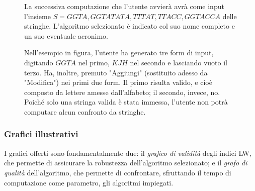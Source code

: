 \begin{figure}[ht!]
    \centering
    \caption{La successiva computazione che l'utente avvierà avrà come input l'insieme $S={GGTA, GGTATATA, TTTAT, TTACC, GGTACCA}$ delle stringhe. L'algoritmo selezionato è indicato col suo nome completo e un suo eventuale acronimo.}
    \label{fig:esempio}
\end{figure}

\begin{figure}[ht!]
    \centering
    \caption{Nell'esempio in figura, l'utente ha generato tre form di input, digitando $GGTA$ nel primo, $KJH$ nel secondo e lasciando vuoto il terzo. Ha, inoltre, premuto "Aggiungi" (sostituito adesso da "Modifica") nei primi due form. Il primo risulta valido, e cioè composto da lettere amesse dall'alfabeto; il secondo, invece, no. Poiché solo una stringa valida è stata immessa, l'utente non potrà computare alcun confronto da stringhe.}
    \label{fig:esempio}
\end{figure}

\newpage

\subsubsection{Grafici illustrativi}

I grafici offerti sono fondamentalmente due: il \textit{grafico di validità} degli indici LW, che permette di assicurare la robustezza dell'algoritmo selezionato; e il \textit{grafo di qualità} dell'algoritmo, che permette di confrontare, sfruttando il tempo di computazione come parametro, gli algoritmi impiegati.

